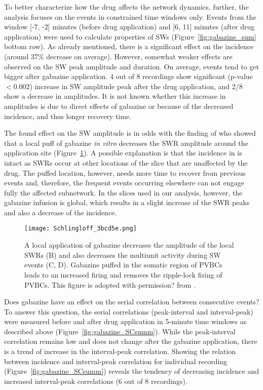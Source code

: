    To better characterize how the drug affects the network dynamics, further,
    the analysis focuses on the events in constrained time windows only. Events
    from the window [-7, -2] minutes (before drug application) and [6, 11]
    minutes (after drug application) were used to calculate properties of SWs
    (Figure~\ref{fig:gabazine_sum} bottom row). As already mentioned, there is
    a significant effect on the incidence (around 37\% decrease on average).
    However, somewhat weaker effects are observed on the SW peak amplitude and
    duration.  On average, events tend to get bigger after gabazine
    application. 4 out of 8 recordings show significant (p-value$<0.002$)
    increase in SW amplitude peak after the drug application, and 2/8 show a
    decrease in amplitudes. It is not known whether this increase in amplitudes
    is due to direct effects of gabazine or because of the decreased incidence,
    and thus longer recovery time. 

    The found effect on the SW amplitude is in odds with the finding of
    \citep{Schlingloff2014} who showed that a local puff of gabazine \textit{in
    vitro} decreases the SWR amplitude around the application site
    (Figure~\ref{fig:schlingloff_gabazine}). A possible explanation is that the
    incidence in \citep{Schlingloff2014} is intact as SWRs occur at other
    locations of the slice that are unaffected by the drug. The puffed
    location, however, needs more time to recover from previous events and,
    therefore, the frequent events occurring elsewhere can not engage fully the
    affected subnetwork. In the slices used in our analysis, however, the
    gabazine infusion is global, which results in a slight increase of the SWR
    peaks and also a decrease of the incidence.
    
    \begin{figure}
      \texttt{[image: Schlingloff\_3bcd5e.png]}
      \caption{A local application of gabazine decreases the amplitude of the
        local SWRs (B) and also decreases the multiunit activity during SW
        events (C, D). Gabazine puffed in the somatic region of PVBCs leads to
        an increased firing and removes the ripple-lock firing of PVBCs. This
        figure is adopted with permission? from \cite{Schlingloff2014}.
      }
    \label{fig:schlingloff_gabazine}
    \end{figure}

    Does gabazine have an effect on the serial correlation between consecutive
    events? To answer this question, the serial correlations (peak-interval and
    interval-peak) were measured before and after drug application in 5-minute
    time windows as described above (Figure~\ref{fig:gabazine_SCsumm}). While
    the peak-interval correlation remains low and does not change after the
    gabazine application, there is a trend of increase in the interval-peak
    correlation. Showing the relation between incidence and interval-peak
    correlation for individual recording (Figure~\ref{fig:gabazine_SCsumm})
    reveals the tendency of decreasing incidence and increased interval-peak
    correlations (6 out of 8 recordings).

